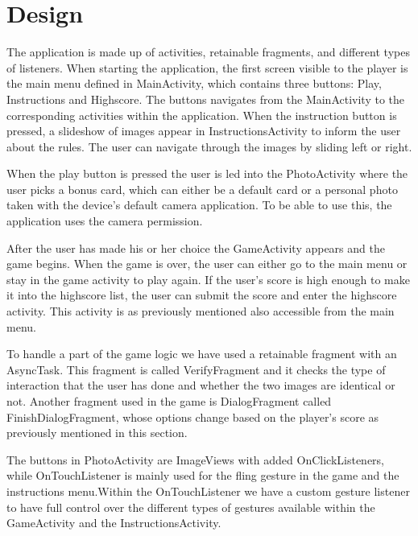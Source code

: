 \section{Design}
The application is made up of activities, retainable fragments, and different types of listeners. When starting the application, the first screen visible to the player is the main menu defined in MainActivity, which contains three buttons: Play, Instructions and Highscore. The buttons navigates from the MainActivity to the corresponding activities within the application. When the instruction button is pressed, a slideshow of images appear in InstructionsActivity to inform the user about the rules. The user can navigate through the images by sliding left or right. \newline

When the play button is pressed the user is led into the PhotoActivity where the user picks a bonus card, which can either be a default card or a personal photo taken with the device’s default camera application. To be able to use this, the application uses the camera permission. \newline

After the user has made his or her choice the GameActivity appears and the game begins. When the game is over, the user can either go to the main menu or stay in the game activity to play again. If the user’s score is high enough to make it into the highscore list, the user can submit the score and enter the highscore activity. This activity is as previously mentioned also accessible from the main menu. \newline

To handle a part of the game logic we have used a retainable fragment with an AsyncTask. This fragment is called VerifyFragment and it checks the type of interaction that the user has done and whether the two images are identical or not. Another fragment used in the game is DialogFragment called FinishDialogFragment, whose options change based on the player’s score as previously mentioned in this section. \newline

The buttons in PhotoActivity are ImageViews with added OnClickListeners, while OnTouchListener is mainly used for the fling gesture in the game and the instructions menu.Within the OnTouchListener we have a custom gesture listener to have full control over the different types of gestures available within the GameActivity and the InstructionsActivity.